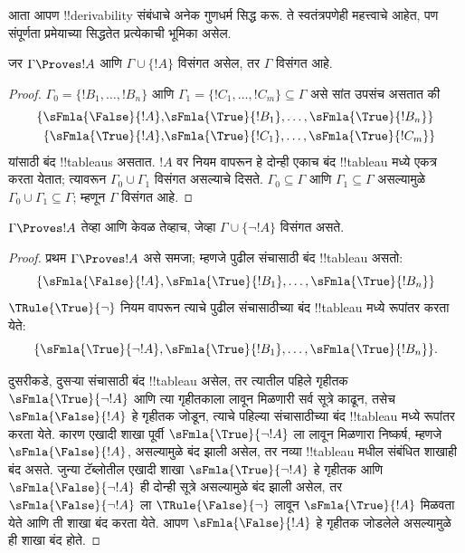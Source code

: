 \documentclass[../../../include/open-logic-section]{subfiles}
\begin{document}
      {}
      {}


आता आपण !!{derivability} संबंधाचे अनेक गुणधर्म सिद्ध करू. ते स्वतंत्रपणेही
महत्त्वाचे आहेत, पण संपूर्णता प्रमेयाच्या सिद्धतेत प्रत्येकाची भूमिका असेल.

\begin{prop}
  जर $\Gamma \Proves !A$ आणि $\Gamma \cup \{!A\}$ विसंगत असेल, तर
  $\Gamma$ विसंगत आहे.
\end{prop}

\begin{proof}
$\Gamma_0 = \{!B_1, \dots, !B_n\}$ आणि $\Gamma_1
  =\{!C_1, \dots, !C_m\} \subseteq \Gamma$ असे सांत उपसंच असतात की
  \begin{align*}
    \{\sFmla{\False}{!A}, &
    \sFmla{\True}{!B_1}, \dots, \sFmla{\True}{!B_n}\} \\
    \{\sFmla{\True}{!A}, &
    \sFmla{\True}{!C_1}, \dots, \sFmla{\True}{!C_m}\}
  \end{align*}
  यांसाठी बंद !!{tableau}s असतात. $!A$ वर \Cut{} नियम वापरून हे दोन्ही
  एकाच बंद !!{tableau} मध्ये एकत्र करता येतात; त्यावरून $\Gamma_0
  \cup \Gamma_1$ विसंगत असल्याचे दिसते. $\Gamma_0
  \subseteq \Gamma$ आणि $\Gamma_1 \subseteq \Gamma$ असल्यामुळे $\Gamma_0 \cup
  \Gamma_1 \subseteq \Gamma$; म्हणून $\Gamma$ विसंगत आहे.
\end{proof}

\begin{prop}
$\Gamma \Proves !A$ तेव्हा आणि केवळ तेव्हाच, जेव्हा $\Gamma \cup \{\lnot !A\}$
विसंगत असते.
\end{prop}

\begin{proof}
प्रथम $\Gamma \Proves !A$ असे समजा; म्हणजे पुढील संचासाठी बंद
!!{tableau} असतो:
\[
\{\sFmla{\False}{!A},
\sFmla{\True}{!B_1}, \dots, \sFmla{\True}{!B_n}\}
\]
$\TRule{\True}{\lnot}$ नियम वापरून त्याचे पुढील संचासाठीच्या बंद
!!{tableau} मध्ये रूपांतर करता येते:
\[
\{\sFmla{\True}{\lnot !A},
\sFmla{\True}{!B_1}, \dots, \sFmla{\True}{!B_n}\}.
\]

दुसरीकडे, दुसऱ्या संचासाठी बंद !!{tableau} असेल, तर त्यातील पहिले
गृहीतक~$\sFmla{\True}{\lnot !A}$ आणि त्या गृहीतकाला
\TRule{\True}{\lnot} लावून मिळणारी सर्व सूत्रे काढून, तसेच
$\sFmla{\False}{!A}$ हे गृहीतक जोडून, त्याचे पहिल्या संचासाठीच्या बंद
!!{tableau} मध्ये रूपांतर करता येते. कारण एखादी शाखा पूर्वी
$\sFmla{\True}{\lnot !A}$ ला \TRule{\True}{\lnot} लावून मिळणारा
निष्कर्ष, म्हणजे $\sFmla{\False}{!A}$, असल्यामुळे बंद झाली असेल, तर नव्या
!!{tableau} मधील संबंधित शाखाही बंद असते. जुन्या टॅब्लोतील एखादी शाखा
$\sFmla{\True}{\lnot !A}$ हे गृहीतक आणि $\sFmla{\False}{\lnot !A}$
ही दोन्ही सूत्रे असल्यामुळे बंद झाली असेल, तर $\sFmla{\False}{\lnot !A}$
ला $\TRule{\False}{\lnot}$ लावून $\sFmla{\True}{!A}$ मिळवता येते आणि
ती शाखा बंद करता येते. आपण $\sFmla{\False}{!A}$ हे गृहीतक जोडलेले
असल्यामुळे ही शाखा बंद होते.
\end{proof}
\end{document}
